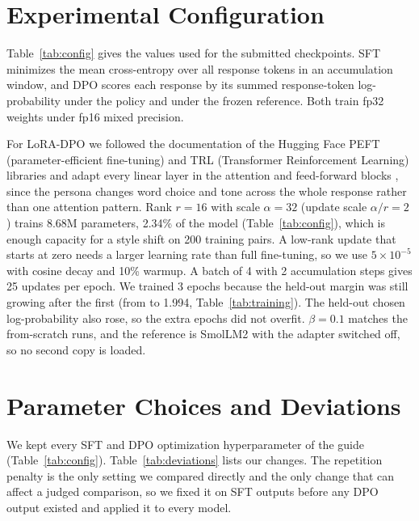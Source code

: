 \documentclass{article}
\begin{document}
\section{Experimental Configuration}
\label{sec:config}

Table~\ref{tab:config} gives the values used for the submitted checkpoints. SFT minimizes the mean cross-entropy over all response tokens in an accumulation window, and DPO scores each response by its summed response-token log-probability under the policy and under the frozen reference. Both train fp32 weights under fp16 mixed precision.

For LoRA-DPO we followed the documentation of the Hugging Face PEFT (parameter-efficient fine-tuning) and TRL (Transformer Reinforcement Learning) libraries and adapt every linear layer in the attention and feed-forward blocks \citep{hu2022lora}, since the persona changes word choice and tone across the whole response rather than one attention pattern. Rank $r=16$ with scale $\alpha=32$ (update scale $\alpha/r=2$) trains 8.68M parameters, 2.34\% of the model (Table~\ref{tab:config}), which is enough capacity for a style shift on 200 training pairs. A low-rank update that starts at zero needs a larger learning rate than full fine-tuning, so we use $5\times10^{-5}$ with cosine decay and 10\% warmup. A batch of 4 with 2 accumulation steps gives 25 updates per epoch. We trained 3 epochs because the held-out margin was still growing after the first (from \personaEpOneMargin{} to 1.994, Table~\ref{tab:training}). The held-out chosen log-probability also rose, so the extra epochs did not overfit. $\beta=0.1$ matches the from-scratch runs, and the reference is SmolLM2 with the adapter switched off, so no second copy is loaded.

\begin{table}[t]
  \centering
  \caption{Configuration of the submitted checkpoints. Both DPO runs use the best SFT checkpoint as the starting policy and as the frozen reference, and the LoRA-DPO reference is SmolLM2 with the adapter switched off. Every compared pair of models uses the same decoding.}
  \label{tab:config}
  \small
  
\end{table}

\section{Parameter Choices and Deviations}
\label{sec:deviations}

We kept every SFT and DPO optimization hyperparameter of the guide (Table~\ref{tab:config}). Table~\ref{tab:deviations} lists our changes. The repetition penalty is the only setting we compared directly and the only change that can affect a judged comparison, so we fixed it on SFT outputs before any DPO output existed and applied it to every model.
\end{document}
